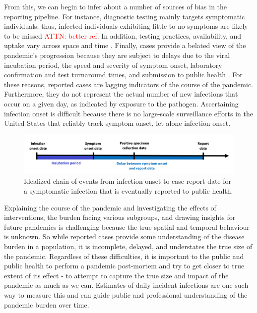 \documentclass{article}
\newcommand{\attn}[1]{\textcolor{red}{ATTN: #1}}
\begin{document}
From this, we can begin to infer about a number of sources of bias in the reporting pipeline. For instance, diagnostic testing mainly targets symptomatic individuals; thus, infected individuals exhibiting little to no symptoms are likely to be missed \citep{cdc2022estimated} \attn{better ref}. In addition, testing practices, availability, and uptake vary across space and time \citep{pitzer2021impact, ecdc2020strategies, hitchings2021usefulness}. Finally, cases provide a belated view of the pandemic's progression because they are subject to delays due to the viral incubation period, the speed and severity of symptom onset, laboratory confirmation and test turnaround times, and submission to public health \citep{pellis2021challenges, wash2020dash}. For these reasons, reported cases are lagging indicators of the course of the pandemic. Furthermore, they do not represent the actual number of new infections that occur on a given day, as indicated by exposure to the pathogen. Ascertaining infection onset is difficult because there is no large-scale surveillance efforts in the United States that reliably track symptom onset, let alone infection onset.

\begin{figure}[!tb]
\centering
    \includegraphics[width=.99\textwidth]{Chain_of_events_onset_report.pdf} 
    \caption{Idealized chain of events from infection onset to case report date for a symptomatic infection that is eventually reported to public health.}
    \label{fig:chain_events_onset_report}
\end{figure}



Explaining the course of the pandemic and investigating the effects of interventions, the burden facing various subgroups, and drawing insights for future pandemics is challenging because the true spatial and temporal behaviour is unknown. So while reported cases provide some understanding of the disease burden in a population, it is incomplete, delayed, and understates the true size of the pandemic. 
Regardless of these difficulties, it is important to the public and public health to perform a pandemic post-mortem and try to get closer to true extent of its effect - to attempt to capture the true size and impact of the pandemic as much as we can. Estimates of daily incident infections are one such way to measure this and can guide public and professional understanding of the pandemic burden over time.
\end{document}
